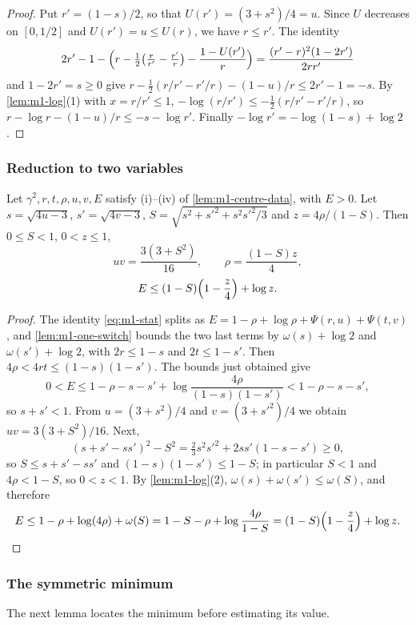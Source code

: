 \begin{proof}
  Put $r'=(1-s)/2$, so that $U(r')=(3+s^2)/4=u$. Since $U$ decreases on $[0,1/2]$ and
  $U(r')=u\le U(r)$, we have $r\le r'$. The identity
  \[
    2r'-1-\Bigl(r-\tfrac12\bigl(\tfrac r{r'}-\tfrac{r'}r\bigr)-\frac{1-U(r')}r\Bigr)
    =\frac{(r'-r)^2(1-2r')}{2rr'}
  \]
  and $1-2r'=s\ge0$ give $r-\frac12(r/r'-r'/r)-(1-u)/r\le 2r'-1=-s$. By
  \cref{lem:m1-log}(1) with $x=r/r'\le1$, $-\log(r/r')\le-\frac12(r/r'-r'/r)$, so
  $r-\log r-(1-u)/r\le -s-\log r'$. Finally $-\log r'=-\log(1-s)+\log2$.
\end{proof}

\subsubsection{Reduction to two variables}

\begin{lemma}\label{lem:m1-reduce}
  Let $\gamma^2,r,t,\rho,u,v,E$ satisfy \textup{(i)--(iv)} of \cref{lem:m1-centre-data}, with
  $E>0$. Let $s=\sqrt{4u-3}$, $s'=\sqrt{4v-3}$,
  $S=\sqrt{s^2+s'^2+s^2s'^2/3}$ and $z=4\rho/(1-S)$. Then $0\le S<1$, $0<z\le1$,
  \[
    uv=\frac{3(3+S^2)}{16},\qquad \rho=\frac{(1-S)z}4,
  \]
  \[
    E\le(1-S)\Bigl(1-\frac z4\Bigr)+\log z.
  \]
\end{lemma}

\begin{proof}
  The identity \eqref{eq:m1-stat} splits as
  $E=1-\rho+\log\rho+\Psi(r,u)+\Psi(t,v)$, and \cref{lem:m1-one-switch} bounds the two last terms
  by $\omega(s)+\log2$ and $\omega(s')+\log2$, with $2r\le1-s$ and $2t\le1-s'$. Then
  $4\rho<4rt\le(1-s)(1-s')$. The bounds just obtained give
  \[
   0<E\le1-\rho-s-s'+\log\frac{4\rho}{(1-s)(1-s')}<1-\rho-s-s',
  \]
  so $s+s'<1$. From $u=(3+s^2)/4$ and
  $v=(3+s'^2)/4$ we obtain $uv=3(3+S^2)/16$. Next,
  \[
    (s+s'-ss')^2-S^2=\tfrac23s^2s'^2+2ss'(1-s-s')\ge0,
  \]
  so $S\le s+s'-ss'$ and $(1-s)(1-s')\le1-S$; in particular $S<1$ and $4\rho<1-S$, so
  $0<z<1$. By \cref{lem:m1-log}(2), $\omega(s)+\omega(s')\le\omega(S)$, and therefore
  \[
    E\le1-\rho+\log(4\rho)+\omega(S)=1-S-\rho+\log\frac{4\rho}{1-S}
    =(1-S)\Bigl(1-\frac z4\Bigr)+\log z .
  \]
\end{proof}

\subsubsection{The symmetric minimum}

The next lemma locates the minimum before estimating its value.

